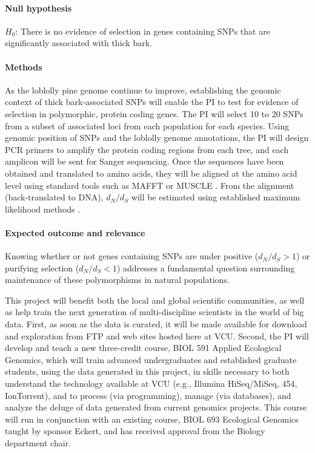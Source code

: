 \paragraph{Null hypothesis} $H_0$: There is no evidence of selection in genes containing SNPs that are significantly associated 
with thick bark.

\paragraph{Methods} As the loblolly pine genome continue to improve, establishing the genomic context of thick 
bark-associated SNPs will enable the PI to test for evidence of selection in polymorphic, protein coding genes.  The PI will select 
10 to 20 SNPs from a subset of associated loci from each population for each species.   Using genomic position of SNPs and the loblolly 
genome annotations, the PI will design PCR primers to amplify the protein coding regions from each tree, and each amplicon will be sent 
for Sanger sequencing.  Once the sequences have been obtained and translated to amino acids, they will be aligned at the amino acid level 
using standard tools such as MAFFT \citep{Katoh:2005ia} or MUSCLE \citep{Edgar:2004ic}.  From the alignment (back-translated to DNA), 
$d_N/d_S$ will be estimated using established maximum likelihood methods \citep{Yang:2007ki}.

\paragraph{Expected outcome and relevance}  Knowing whether or not genes containing SNPs are under positive ($d_N/d_S > 1$) or 
purifying selection ($d_N/d_S < 1$) addresses a fundamental question surrounding maintenance of these polymorphisms in 
natural populations.  

This project will benefit both the local and global scientific communities, as well as help train 
the next generation of multi-discipline scientists in the world of big data.  First, as soon as the data is curated, it will be made 
available for download and exploration from FTP and web sites hosted here at VCU.  Second, the PI will develop and teach a new 
three-credit course, BIOL 591 Applied Ecological Genomics, which will train advanced undergraduates and established 
graduate students, using the data generated in this project, in skills necessary to both understand the 
technology available at VCU (e.g., Illumina HiSeq/MiSeq, 454, IonTorrent), and to 
process (via programming), manage (via databases), and analyze the deluge of data generated from current genomics 
projects.  This course will run in conjunction with an existing course, BIOL 693 Ecological Genomics taught by sponsor Eckert, 
and has received approval from the Biology department chair.

